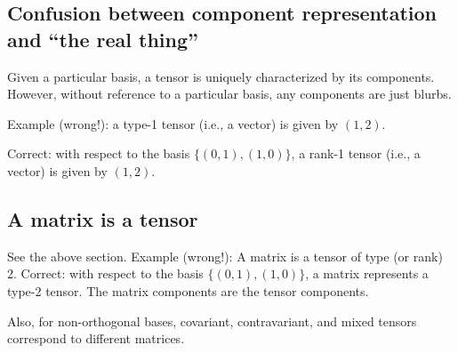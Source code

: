 \subsection{Confusion between component representation and ``the real thing''}
Given a particular basis, a tensor is uniquely characterized by its components.
However, without reference to a particular basis, any components are just blurbs.

Example (wrong!): a type-1 tensor (i.e., a vector) is given by
$(1,2)$.

Correct: with respect to the basis $\{(0,1),(1,0)\}$,  a rank-1 tensor (i.e., a vector) is given by
$(1,2)$.


\subsection{A matrix is a tensor}

See the above section.
{
\color{blue}
\bexample
Example (wrong!): A matrix is  a  tensor of type (or rank) 2.
\eexample
}
Correct: with respect to the basis $\{(0,1),(1,0)\}$,  a matrix represents a type-2 tensor.
The matrix components are the tensor components.

Also, for non-orthogonal bases, covariant, contravariant, and mixed tensors correspond to different matrices.


\begin{center}
{\color{olive}   \Huge
\floweroneright
}
\end{center}


